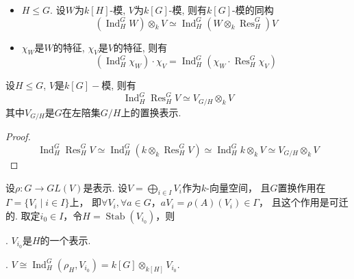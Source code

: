 
\begin{proposition}
    \begin{itemize}
        \item[(1)]
        $H\leq G$. 设$W$为$k[H]$-模, $V$为$k[G]$-模, 则有$k[G]$-模的同构
        $$(\operatorname{Ind}^G_HW)\otimes_kV\simeq
        \operatorname{Ind}^G_H(W\otimes_k\operatorname{Res}^G_H)V$$
        \item[(2)]
        $\chi_W$是$W$的特征, $\chi_V$是$V$的特征, 则有
        $$(\operatorname{Ind}^G_H \chi _W)\cdot\chi _V
        =\operatorname{Ind}^G_H(\chi_W\cdot\operatorname{Res}^G_H\chi_V)$$
    \end{itemize}
\end{proposition}

\begin{corollary}
    设$H\leq G$, $V$是$k[G]-$模, 则有
    $$\operatorname{Ind}^G_H\operatorname{Res}^G_H V
    \simeq V_{G/H}\otimes_k V$$
    其中$V_{G/H}$是$G$在左陪集$G/H$上的置换表示.
\end{corollary}

\begin{proof}
    $$\operatorname{Ind}^G_H\operatorname{Res}^G_H V\simeq
    \operatorname{Ind}^G_H(k \otimes_k \operatorname{Res}^G_H V)\simeq
    \operatorname{Ind}^G_H k \otimes_k V\simeq
    V_{G/H}\otimes_k V
    $$
\end{proof}

\begin{proposition}
    设$\rho:G\rightarrow GL(V)$是表示. 
    设$V=\bigoplus\limits_{i\in I}V_i$作为$k$-向量空间，
    且$G$置换作用在$\Gamma=\{V_i\mid i\in I\}$上，
    即$\forall V_i, \forall a\in G$，$aV_i=\rho(A)(V_i)\in \Gamma$，
    且这个作用是可迁的. 取定$i_0\in I$，令$H=\operatorname{Stab}(V_{i_0})$，则\par
    . $V_{i_0}$是$H$的一个表示.\par
    . $V\cong \operatorname{Ind}_H^G(\rho_H,V_{i_0})=k[G]\otimes_{k[H]} V_{i_0}.$
\end{proposition}

